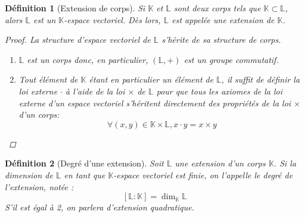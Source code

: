 \documentclass[a4paper,12pt,french]{report}
\newtheorem{definition}{Définition}[section]
\begin{document}
			
			\begin{definition}[Extension de corps]
			
				Si \( \mathbb{K} \) et \( \mathbb{L} \) sont deux corps tels que \(\mathbb{K} \subset  \mathbb{L} \), alors
				\(\mathbb{L}\) est un \(\mathbb{K}\)-espace vectoriel. Dès lors, \(\mathbb{L}\) est appelée une \emph{extension} de \(\mathbb{K}\).
			
				\begin{proof}
					La structure d'espace vectoriel de \(\mathbb{L}\) s'hérite de sa structure de corps.
					\begin{enumerate}
						\item \(\mathbb{L}\) est un corps donc, en particulier, \((\mathbb{L}, +)\) est un groupe commutatif.
						\item Tout élément de \(\mathbb{K}\) étant en particulier un élément de \(\mathbb{L}\), il suffit de définir la loi
						externe \(\cdot\) à l'aide de la loi \( \times \) de \(\mathbb{L}\) pour que tous les axiomes de la loi externe d'un espace vectoriel s'héritent directement des propriétés de la loi \( \times \) d'un corps:
							\[
							\forall (x, y) \in \mathbb{K} \times \mathbb{L}, x \cdot y = x \times y
							\]
					\end{enumerate}
				\end{proof}
			\end{definition}
			
			
			
			
			\begin{definition}[Degré d'une extension]
				Soit \(\mathbb{L}\) une extension d'un corps \(\mathbb{K}\). Si la dimension de \(\mathbb{L}\) en tant que \(\mathbb{K}\)-espace vectoriel est finie, on l'appelle le \emph{degré} de l'extension, notée :
				\[
				[\mathbb{L}:\mathbb{K}] = \dim_\mathbb{K}\mathbb{L}
				\]
				S'il est égal à 2, on parlera d'\emph{extension quadratique}.
			\end{definition}
			
\end{document}
